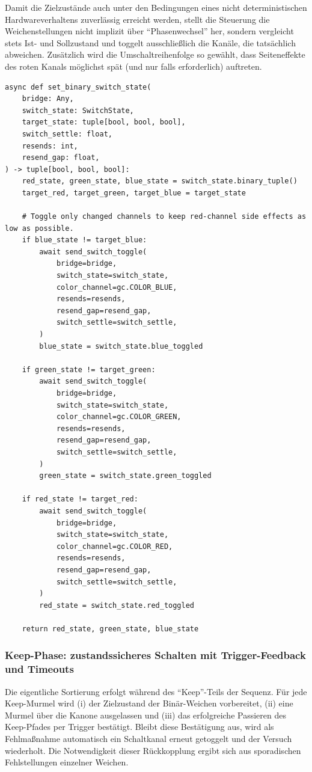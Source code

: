 Damit die Zielzustände auch unter den Bedingungen eines nicht deterministischen Hardwareverhaltens zuverlässig erreicht werden, stellt die Steuerung die Weichenstellungen nicht implizit über ``Phasenwechsel'' her, sondern vergleicht stets Ist- und Sollzustand und toggelt ausschließlich die Kanäle, die tatsächlich abweichen. Zusätzlich wird die Umschaltreihenfolge so gewählt, dass Seiteneffekte des roten Kanals möglichst spät (und nur falls erforderlich) auftreten.

\begin{listing}[ht]
\caption{Auszug: Zustandsabgleich und selektives Umschalten der Binär-Weichen}
\label{lst:set_binary_switch_state}
\begin{verbatim}
async def set_binary_switch_state(
	bridge: Any,
	switch_state: SwitchState,
	target_state: tuple[bool, bool, bool],
	switch_settle: float,
	resends: int,
	resend_gap: float,
) -> tuple[bool, bool, bool]:
	red_state, green_state, blue_state = switch_state.binary_tuple()
	target_red, target_green, target_blue = target_state

	# Toggle only changed channels to keep red-channel side effects as low as possible.
	if blue_state != target_blue:
		await send_switch_toggle(
			bridge=bridge,
			switch_state=switch_state,
			color_channel=gc.COLOR_BLUE,
			resends=resends,
			resend_gap=resend_gap,
			switch_settle=switch_settle,
		)
		blue_state = switch_state.blue_toggled

	if green_state != target_green:
		await send_switch_toggle(
			bridge=bridge,
			switch_state=switch_state,
			color_channel=gc.COLOR_GREEN,
			resends=resends,
			resend_gap=resend_gap,
			switch_settle=switch_settle,
		)
		green_state = switch_state.green_toggled

	if red_state != target_red:
		await send_switch_toggle(
			bridge=bridge,
			switch_state=switch_state,
			color_channel=gc.COLOR_RED,
			resends=resends,
			resend_gap=resend_gap,
			switch_settle=switch_settle,
		)
		red_state = switch_state.red_toggled

	return red_state, green_state, blue_state
\end{verbatim}
\end{listing}

\subsubsection{Keep-Phase: zustandssicheres Schalten mit Trigger-Feedback und Timeouts}
Die eigentliche Sortierung erfolgt während des ``Keep''-Teils der Sequenz. Für jede Keep-Murmel wird (i) der Zielzustand der Binär-Weichen vorbereitet, (ii) eine Murmel über die Kanone ausgelassen und (iii) das erfolgreiche Passieren des Keep-Pfades per Trigger bestätigt. Bleibt diese Bestätigung aus, wird als Fehlmaßnahme automatisch ein Schaltkanal erneut getoggelt und der Versuch wiederholt. Die Notwendigkeit dieser Rückkopplung ergibt sich aus sporadischen Fehlstellungen einzelner Weichen.

